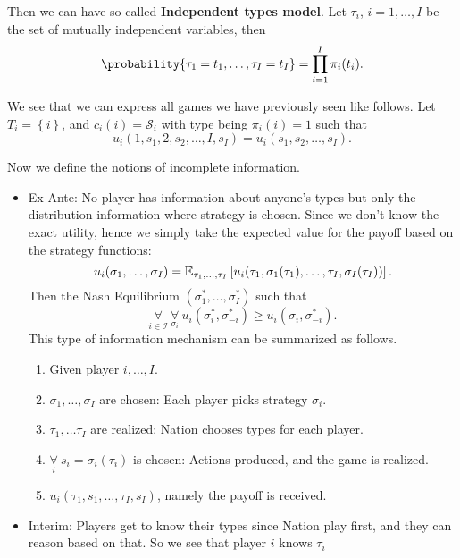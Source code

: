 \hr

Then we can have so-called \textbf{Independent types model}. Let \(\tau_{i}\), \(i = 1, \ldots , I\) be the set of mutually independent
variables, then
\[
	\probability{\tau_{1} = t_1, \ldots , \tau_{I} = t_{I}}=\prod\limits_{i = 1}^{I} \pi_{i}(t_{i}).
\]

\hr

We see that we can express all games we have previously seen like follows. Let \(T_{i} = \left\{i\right\}\), and
\(c_{i}(i) = \mathcal{S}_{i}\) with type being \(\pi_i(i) = 1\) such that
\[
	u_{i}(1, s_1, 2, s_2, \ldots , I, s_I) = u_{i}(s_1, s_2, \ldots , s_I).
\]

\hr

Now we define the notions of incomplete information.
\begin{itemize}
	\item Ex-Ante: No player has information about anyone's types but only the distribution information where strategy is chosen.
	      Since we don't know the exact utility, hence we simply take the expected value for the payoff based on the strategy functions:
	      \[
		      u_{i}(\sigma_1, \ldots , \sigma_I)=\mathbb{\MakeUppercase{E}}_{\tau_1, \ldots , \tau_I}\left[u_{i}(\tau_1, \sigma_1(\tau_1), \ldots ,\tau_I, \sigma_I(\tau_I) )\right].
	      \]
	      Then the Nash Equilibrium \((\sigma_1^{*}, \ldots , \sigma_{I}^{*})\) such that
	      \[
		      \underset{i\in\mathcal{I}}{\forall} \ \underset{\sigma_{i}}{\forall}\ u_{i}(\sigma_{i}^{*}, \sigma^{*}_{-i})\geq u_{i}(\sigma_{i}, \sigma^{*}_{-i}).
	      \]
	      This type of information mechanism can be summarized as follows.
	      \begin{enumerate}
		      \item Given player \(i, \ldots , I\).
		      \item \(\sigma_1, \ldots , \sigma_{I}\) are chosen: Each player picks strategy \(\sigma_{i}\).
		      \item \(\tau_1, \ldots \tau_{I}\) are realized: Nation chooses types for each player.
		      \item \(\underset{i}{\forall }\ s_{i} = \sigma_{i}(\tau_{i})\) is chosen: Actions produced, and the game is realized.
		      \item \(u_{i}(\tau_1, s_1, \ldots , \tau_{I}, s_{I})\), namely the payoff is received.
	      \end{enumerate}
	\item Interim: Players get to know their types since Nation play first, and they can reason based on that. So we see that player \(i\) knows \(\tau_{i}\)

\end{itemize}
